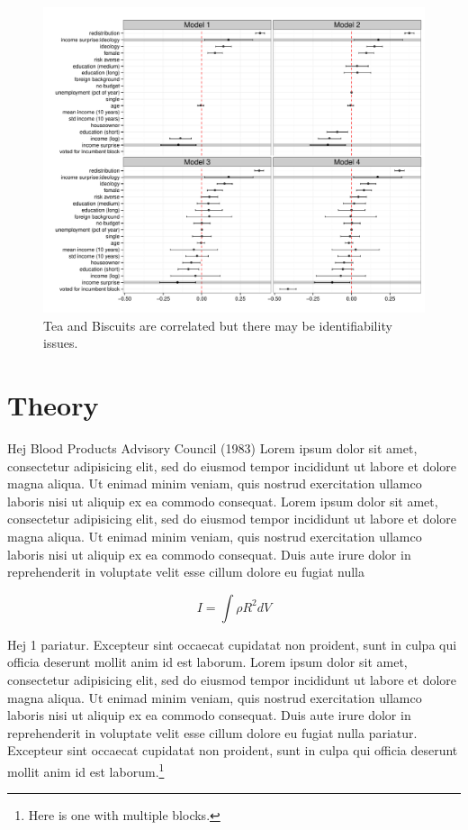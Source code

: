\documentclass[11pt,article,oneside]{memoir}
\makeatletter
\def\maxwidth{\ifdim\Gin@nat@width>\linewidth\linewidth
\else\Gin@nat@width\fi}
\let\Oldincludegraphics\includegraphics
\renewcommand{\includegraphics}[1]{\Oldincludegraphics[width=\maxwidth]{#1}}
\makeatother
\begin{document}
\begin{figure}[htbp]
\centering
\includegraphics{figures/ols_75_redist_coefplot.pdf}
\caption{Tea and Biscuits are correlated but there may be
identifiability issues.}
\end{figure}

\section{Theory}\label{theory}

Hej Blood Products Advisory Council (1983) Lorem ipsum dolor sit amet,
consectetur adipisicing elit, sed do eiusmod tempor incididunt ut labore
et dolore magna aliqua. Ut enimad minim veniam, quis nostrud
exercitation ullamco laboris nisi ut aliquip ex ea commodo consequat.
Lorem ipsum dolor sit amet, consectetur adipisicing elit, sed do eiusmod
tempor incididunt ut labore et dolore magna aliqua. Ut enimad minim
veniam, quis nostrud exercitation ullamco laboris nisi ut aliquip ex ea
commodo consequat. Duis aute irure dolor in reprehenderit in voluptate
velit esse cillum dolore eu fugiat nulla

\begin{equation}
I = \int \rho R^{2} dV
\end{equation}

Hej 1 pariatur. Excepteur sint occaecat cupidatat non proident, sunt in
culpa qui officia deserunt mollit anim id est laborum. Lorem ipsum dolor
sit amet, consectetur adipisicing elit, sed do eiusmod tempor incididunt
ut labore et dolore magna aliqua. Ut enimad minim veniam, quis nostrud
exercitation ullamco laboris nisi ut aliquip ex ea commodo consequat.
Duis aute irure dolor in reprehenderit in voluptate velit esse cillum
dolore eu fugiat nulla pariatur. Excepteur sint occaecat cupidatat non
proident, sunt in culpa qui officia deserunt mollit anim id est
laborum.\footnote{Here is one with multiple blocks.}
\end{document}
